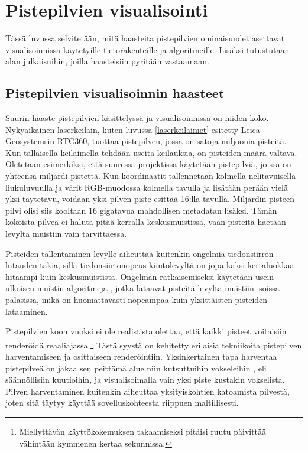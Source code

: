 \section{Pistepilvien visualisointi}\label{kirjallisuus}

Tässä luvussa selvitetään, mitä haasteita pistepilvien ominaisuudet asettavat visualisoinnissa käytetyille tietorakenteille ja algoritmeille. Lisäksi tutustutaan alan julkaisuihin, joilla haasteisiin pyritään vastaamaan.

\subsection{Pistepilvien visualisoinnin haasteet}

Suurin haaste pistepilvien käsittelyssä ja visualisoinnissa on niiden koko. Nykyaikainen laserkeilain, kuten luvussa \ref{laserkeilaimet} esitetty Leica Geosystemsin RTC360, tuottaa pistepilven, jossa on satoja miljoonia pisteitä. Kun tällaisella keilaimella tehdään useita keilauksia, on pisteiden määrä valtava. Oletetaan esimerkiksi, että suuressa projektissa käytetään pistepilviä, joissa on yhteensä miljardi pistettä. Kun koordinaatit tallennetaan kolmella nelitavuisella liukuluvuulla ja värit RGB-muodossa kolmella tavulla ja lisätään perään vielä yksi täytetavu, voidaan yksi pilven piste esittää 16:lla tavulla. Miljardin pisteen pilvi olisi siis kooltaan 16 gigatavua mahdollisen metadatan lisäksi. Tämän kokoista pilveä ei haluta pitää kerralla keskusmuistissa, vaan pisteitä haetaan levyltä muistiin vain tarvittaessa. 

Pisteiden tallentaminen levylle aiheuttaa kuitenkin ongelmia tiedonsiirron hitauden takia, sillä tiedonsiirtonopeus kiintolevyltä on jopa kaksi kertaluokkaa hitaampi kuin keskusmuistista. Ongelman ratkaisemiseksi käytetään usein ulkoisen muistin algoritmeja , jotka lataavat pisteitä levyltä muistiin isoissa palasissa, mikä on huomattavasti nopeampaa kuin yksittäisten pisteiden lataaminen. \cite{scheiblauer} 

Pistepilvien koon vuoksi ei ole realistista olettaa, että kaikki pisteet voitaisiin renderöidä reaaliajassa.\footnote{Miellyttävän käyttökokemuksen takaamiseksi pitäisi ruutu päivittää vähintään kymmenen kertaa sekunnissa.} Tästä syystä on kehitetty erilaisia tekniikoita pistepilven harventamiseen ja osittaiseen renderöintiin. Yksinkertainen tapa harventaa pistepilveä on jakaa sen peittämä alue niin kutsuttuihin vokseleihin , eli säännöllisiin kuutioihin, ja visualisoimalla vain yksi piste kustakin vokselista. Pilven harventaminen kuitenkin aiheuttaa yksityiskohtien katoamista pilvestä, joten sitä täytyy käyttää sovelluskohteesta riippuen maltillisesti. 

